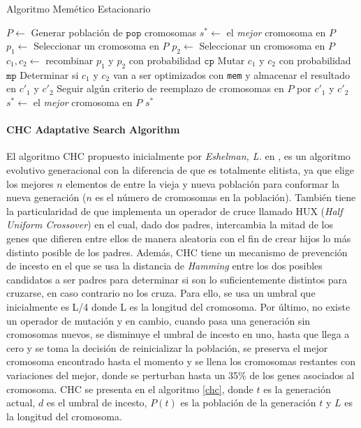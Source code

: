\begin{algorithm}
\caption{Algoritmo Memético Estacionario}
\label{ssma}
\begin{algorithmic}[1]


\State $P \gets$ Generar población de $\texttt{pop}$ cromosomas
\State $s^* \gets $ el \emph{mejor} cromosoma en $P$
	\State $p_1 \gets$ Seleccionar un cromosoma en $P$
	\State $p_2 \gets$ Seleccionar un cromosoma en $P$
	\State $c_1, c_2 \gets $ recombinar $p_1$ y $p_2$ con probabilidad $\texttt{cp}$
	\State Mutar $c_1$ y $c_2$ con probabilidad $\texttt{mp}$
	\State Determinar si $c_1$ y $c_2$ van a ser optimizados con \texttt{mem} y almacenar el resultado en $c'_1$ y $c'_2$
	\State Seguir algún criterio de reemplazo de cromosomas en $P$ por $c'_1$ y $c'_2$
		\State $s^* \gets$ el \emph{mejor} cromosoma en $P$
	\EndIf
\EndWhile
\State \Return $s^*$

\end{algorithmic}
\end{algorithm}

\paragraph{CHC Adaptative Search Algorithm}

El algoritmo CHC propuesto inicialmente por \emph{Eshelman, L.} en \cite{eshelman1991chc}, es un algoritmo evolutivo generacional con la diferencia de que es totalmente elitista, ya que elige los mejores $n$ elementos de entre la vieja y nueva población para conformar la nueva generación ($n$ es el número de cromosomas en la población). También tiene la particularidad de que implementa un operador de cruce llamado HUX (\emph{Half Uniform Crossover}) en el cual, dado dos padres, intercambia la mitad de los genes que difieren entre ellos de manera aleatoria con el fin de crear hijos lo más distinto posible de los padres. Además, CHC tiene un mecanismo de prevención de incesto en el que se usa la distancia de \emph{Hamming} entre los dos posibles candidatos a ser padres para determinar si son lo suficientemente distintos para cruzarse, en caso contrario no los cruza. Para ello, se usa un umbral que inicialmente es L/4 donde L es la longitud del cromosoma. Por último, no existe un operador de mutación y en cambio, cuando pasa una generación sin cromosomas nuevos, se disminuye el umbral de incesto en uno, hasta que llega a cero y se toma la decisión de reinicializar la población, se preserva el mejor cromosoma encontrado hasta el momento y se llena los cromosomas restantes con variaciones del mejor, donde se perturban hasta un 35\% de los genes asociados al cromosoma. CHC se presenta en el algoritmo \ref{chc}, donde $t$ es la generación actual, $d$ es el umbral de incesto, $P(t)$ es la población de la generación $t$ y $L$ es la longitud del cromosoma.

